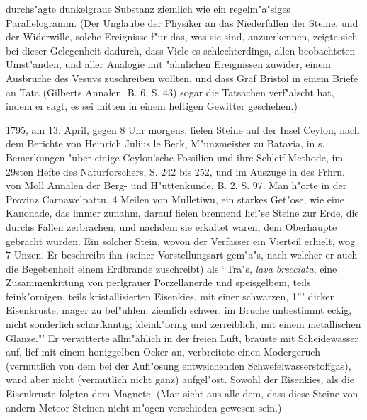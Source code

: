 \documentclass[a4paper, 11pt, oneside, polutonikogreek, german]{article}
\begin{document}
durchs"agte dunkelgraue Substanz ziemlich wie ein regelm"a"siges Parallelogramm. (Der Unglaube der Physiker an das Niederfallen der Steine, und der Widerwille, solche Ereignisse f"ur das, was sie sind, anzuerkennen, zeigte sich bei dieser Gelegenheit dadurch, dass Viele es schlechterdings, allen beobachteten Umst"anden, und aller Analogie mit "ahnlichen Ereignissen zuwider, einem Ausbruche des Vesuvs zuschreiben wollten, und dass Graf Bristol in einem Briefe an Tata (Gilberts Annalen, B. 6, S. 43) sogar die Tatsachen verf"alscht hat, indem er sagt, es sei mitten in einem heftigen Gewitter geschehen.)

1795, am 13. April, gegen 8 Uhr morgens, fielen Steine auf der Insel Ceylon, nach dem Berichte von Heinrich Julius le Beck, M"unzmeister zu Batavia, in s. Bemerkungen "uber einige Ceylon'sche Fossilien und ihre Schleif-Methode, im 29sten Hefte des Naturforschers, S. 242 bis 252, und im Auszuge in des Frhrn. von Moll Annalen der Berg- und H"uttenkunde, B. 2, S. 97. Man h"orte in der Provinz Carnawelpattu, 4 Meilen von Mulletiwu, ein starkes Get"ose, wie eine Kanonade, das immer zunahm, darauf fielen brennend hei"se Steine zur Erde, die durchs Fallen zerbrachen, und nachdem sie erkaltet waren, dem Oberhaupte gebracht wurden. Ein solcher Stein, wovon der Verfasser ein Vierteil erhielt, wog 7 Unzen. Er beschreibt ihn (seiner Vorstellungsart gem"a"s, nach welcher er auch die Begebenheit einem Erdbrande zuschreibt) als "`Tra"s, \emph{lava brecciata}, eine Zusammenkittung von perlgrauer Porzellanerde und speisgelbem, teils feink"ornigen, teils kristallisierten Eisenkies, mit einer schwarzen, 1"'' dicken Eisenkruste; mager zu bef"uhlen, ziemlich schwer, im Bruche unbestimmt eckig, nicht sonderlich scharfkantig; kleink"ornig und zerreiblich, mit einem metallischen Glanze."' Er verwitterte allm"ahlich in der freien Luft, brauste mit Scheidewasser auf, lief mit einem honiggelben Ocker an, verbreitete einen Modergeruch (vermutlich von dem bei der Aufl"osung entweichenden Schwefelwasserstoffgas), ward aber nicht (vermutlich nicht ganz) aufgel"ost. Sowohl der Eisenkies, als die Eisenkruste folgten dem Magnete. (Man sieht aus alle dem, dass diese Steine von andern Meteor-Steinen nicht m"ogen verschieden gewesen sein.)
\end{document}
